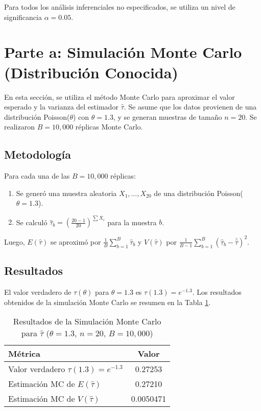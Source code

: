 \documentclass[
  11pt,
  a4paper]{article}
\begin{document}
Para todos los análisis inferenciales no especificados, se utiliza un
nivel de significancia \(\alpha = 0.05\).

\section{Parte a: Simulación Monte Carlo (Distribución Conocida)}

En esta sección, se utiliza el método Monte Carlo para aproximar el
valor esperado y la varianza del estimador \(\hat{\tau}\). Se asume que
los datos provienen de una distribución Poisson(\(\theta\)) con
\(\theta = 1.3\), y se generan muestras de tamaño \(n=20\). Se
realizaron \(B = 10,000\) réplicas Monte Carlo.

\subsection{Metodología}

Para cada una de las \(B=10,000\) réplicas:

\begin{enumerate}
    \item Se generó una muestra aleatoria $X_1, \dots, X_{20}$ de una distribución Poisson($\theta=1.3$).
    \item Se calculó $\hat{\tau}_b = \left(\frac{20-1}{20}\right)^{\sum X_i}$ para la muestra $b$.
\end{enumerate}

Luego, \(E(\hat{\tau})\) se aproximó por
\(\frac{1}{B}\sum_{b=1}^B \hat{\tau}_b\) y \(V(\hat{\tau})\) por
\(\frac{1}{B-1}\sum_{b=1}^B (\hat{\tau}_b - \bar{\hat{\tau}})^2\).

\subsection{Resultados}

El valor verdadero de \(\tau(\theta)\) para \(\theta=1.3\) es
\(\tau(1.3) = e^{-1.3}\). Los resultados obtenidos de la simulación
Monte Carlo se resumen en la Tabla \ref{tab:mc_results}.

\begin{table}[H]
    \centering
    \caption{Resultados de la Simulación Monte Carlo para $\hat{\tau}$ ($\theta=1.3$, $n=20$, $B=10,000$)}
    \label{tab:mc_results}
    \begin{tabular}{lc}
        \toprule
        Métrica & Valor \\
        \midrule
        Valor verdadero $\tau(1.3) = e^{-1.3}$ & 0.27253 \\
        Estimación MC de $E(\hat{\tau})$ & 0.27210 \\
        Estimación MC de $V(\hat{\tau})$ & 0.0050471 \\
        \bottomrule
    \end{tabular}
\end{table}
\end{document}

